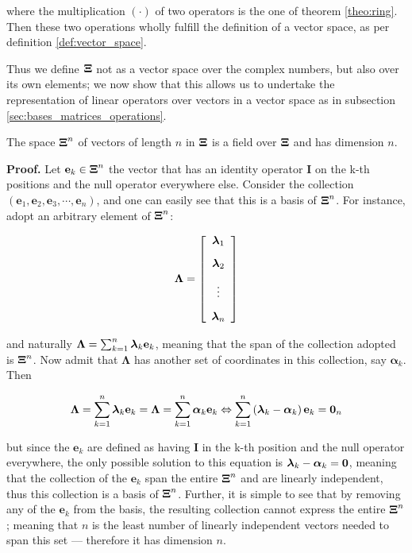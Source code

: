 	\noindent where the multiplication $(\cdot)$ of two operators is the one of theorem \ref{theo:ring}. Then these two operations wholly fulfill the definition of a vector space, as per definition \ref{def:vector_space}.

	Thus we define $\boldsymbol{\Xi}$ not as a vector space over the complex numbers, but also over its own elements; we now show that this allows us to undertake the representation of linear operators over vectors in a vector space as in subsection \ref{sec:bases_matrices_operations}.

\begin{lemma} The space $\boldsymbol{\Xi}^n$ of vectors of length $n$ in $\boldsymbol{\Xi}$ is a field over $\boldsymbol{\Xi}$ and has dimension $n$. \end{lemma}
\textbf{Proof.} Let $\mathbf{e}_k\in\boldsymbol{\Xi}^n$ the vector that has an identity operator $\mathbf{I}$ on the k-th positions and the null operator everywhere else. Consider the collection $\left(\mathbf{e}_1,\mathbf{e}_2,\mathbf{e}_3, \cdots ,\mathbf{e}_n\right)$, and one can easily see that this is a basis of $\boldsymbol{\Xi}^n$. For instance, adopt an arbitrary element of $\boldsymbol{\Xi}^n$:

\begin{equation} \boldsymbol{\Lambda} = \left[\begin{array}{c} \boldsymbol{\lambda}_{1} \\[3mm] \boldsymbol{\lambda}_{2} \\[3mm] \vdots \\[3mm] \boldsymbol{\lambda}_{n} \end{array}\right] \end{equation}

	\noindent and naturally $\boldsymbol{\Lambda} = \sum_{k=1}^n \boldsymbol{\lambda}_k \mathbf{e}_k$, meaning that the span of the collection adopted is $\boldsymbol{\Xi}^n$. Now admit that $\boldsymbol{\Lambda}$ has another set of coordinates in this collection, say $\boldsymbol{\alpha}_k$. Then

\begin{equation} \boldsymbol{\Lambda} = \sum_{k=1}^n \boldsymbol{\lambda}_k \mathbf{e}_k = \boldsymbol{\Lambda} = \sum_{k=1}^n \boldsymbol{\alpha}_k \mathbf{e}_k \Leftrightarrow \sum_{k=1}^n \left(\boldsymbol{\lambda}_k - \boldsymbol{\alpha}_k\right)\mathbf{e}_k = \mathbf{0}_n\end{equation}

	\noindent but since the $\mathbf{e}_k$ are defined as having $\mathbf{I}$ in the k-th position and the null operator everywhere, the only possible solution to this equation is $\boldsymbol{\lambda}_k - \boldsymbol{\alpha}_k = \mathbf{0}$, meaning that the collection of the $\mathbf{e}_k$ span the entire $\boldsymbol{\Xi}^n$ and are linearly independent, thus this collection is a basis of $\boldsymbol{\Xi}^n$. Further, it is simple to see that by removing any of the $\mathbf{e}_k$ from the basis, the resulting collection cannot express the entire $\boldsymbol{\Xi}^n$; meaning that $n$ is the least number of linearly independent vectors needed to span this set — therefore it has dimension $n$.

